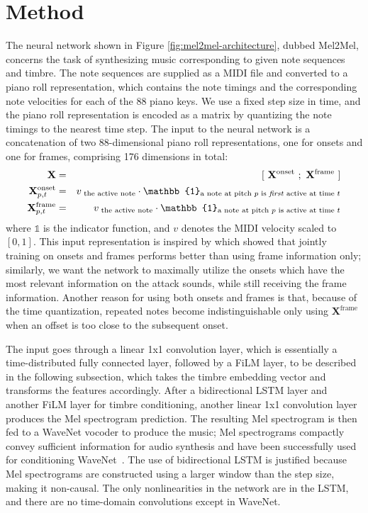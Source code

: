\pagebreak %

\section{Method}\label{sec:method}

The neural network shown in Figure \ref{fig:mel2mel-architecture}, dubbed Mel2Mel, concerns the task of synthesizing music corresponding to given note sequences and timbre.
The note sequences are supplied as a MIDI file and converted to a piano roll representation, which contains the note timings and the corresponding note velocities for each of the 88 piano keys.
We use a fixed step size in time, and the piano roll representation is encoded as a matrix by quantizing the note timings to the nearest time step.
The input to the neural network is a concatenation of two 88-dimensional piano roll representations, one for onsets and one for frames, comprising 176 dimensions in total:
\begin{eqnarray*}
	\mathbf{X} & =&  [~ \mathbf{X}^{\textrm{onset}} ~;~ \mathbf{X}^{\textrm{frame}} ~] \\
	\mathbf{X}^{\textrm{onset}}_{p,t} &= & v_{\textrm{~the active note}} \cdot \mathbb{1}_{\textrm{a note at pitch $p$ is \textit{first} active at time $t$}} \\
	\mathbf{X}^{\textrm{frame}}_{p,t} &= & v_{\textrm{~the active note}} \cdot \mathbb{1}_{\textrm{a note at pitch $p$ is active at time $t$}}
\end{eqnarray*}
\noindent where $\mathbb{1}$ is the indicator function, and $v$ denotes the MIDI velocity scaled to $[0, 1]$.
This input representation is inspired by \cite{hawthorne2018onsetsframes} which showed that jointly training on onsets and frames performs better than using frame information only;
similarly, we want the network to maximally utilize the onsets which have the most relevant information on the attack sounds, while still receiving the frame information.
Another reason for using both onsets and frames is that, because of the time quantization, repeated notes become indistinguishable only using $\mathbf{X}^\textrm{frame}$ when an offset is too close to the subsequent onset.

The input goes through a linear 1x1 convolution layer, which is essentially a time-distributed fully connected layer, followed by a FiLM layer, to be described in the following subsection, which takes the timbre embedding vector and transforms the features accordingly.
After a bidirectional LSTM layer and another FiLM layer for timbre conditioning, another linear 1x1 convolution layer produces the Mel spectrogram prediction.
The resulting Mel spectrogram is then fed to a WaveNet vocoder to produce the music; Mel spectrograms compactly convey sufficient information for audio synthesis and have been successfully used for conditioning WaveNet~\cite{shen2018tacotron,ping2018deepvoice3}.
The use of bidirectional LSTM is justified because Mel spectrograms are constructed using a larger window than the step size, making it non-causal.
The only nonlinearities in the network are in the LSTM, and there are no time-domain convolutions except in WaveNet.


